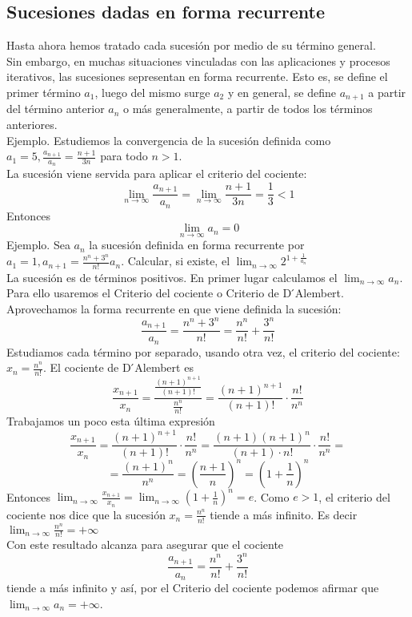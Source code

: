 \documentclass[../Teoría.root.tex]{subfiles}
\begin{document}
\subsection{Sucesiones dadas en forma recurrente}
Hasta ahora hemos tratado cada sucesión por medio de su término general.\\
Sin embargo, en muchas situaciones vinculadas con las aplicaciones y procesos iterativos, las sucesiones sepresentan en forma recurrente.
Esto es, se define el primer término \(a_1\), luego del mismo surge \(a_2\) y en general, se define \(a_{n+1}\) a partir del término anterior \(a_n\) o más generalmente, a partir de todos los términos anteriores.\\
Ejemplo.
Estudiemos la convergencia de la sucesión definida como \(a_1=5,\frac{a_{n+1}}{a_n}=\frac{n+1}{3n}\) para todo \(n>1\).\\
La sucesión viene servida para aplicar el criterio del cociente:
\[\lim_{n\to\infty}\frac{a_{n+1}}{a_n}=\lim_{n\to\infty}\frac{n+1}{3n}=\frac{1}{3}<1\]
Entonces
\[\lim_{n\to\infty}a_n=0\]
Ejemplo. Sea \(a_n\) la sucesión definida en forma recurrente por \(a_1=1,a_{n+1}=\frac{n^n+3^n}{n!}a_n\).
Calcular, si existe, el \(\lim_{n\to\infty}2^{1+\frac{1}{a_n}}\)\\
La sucesión es de términos positivos.
En primer lugar calculamos el \(\lim_{n\to\infty}a_n\).
Para ello usaremos el Criterio del cociente o Criterio de D ́Alembert.\\
Aprovechamos la forma recurrente en que viene definida la sucesión:
\[\frac{a_{n+1}}{a_n}=\frac{n^n+3^n}{n!}=\frac{n^n}{n!}+\frac{3^n}{n!}\]
Estudiamos cada término por separado, usando otra vez, el criterio del cociente:
\(x_n=\frac{n^n}{n!}\).
El cociente de D ́Alembert es
\[\frac{x_{n+1}}{x_n}=\frac{\frac{(n+1)^{n+1}}{(n+1)!}}{\frac{n^n}{n!}}=\frac{(n+1)^{n+1}}{(n+1)!}\cdot\frac{n!}{n^n}\]
Trabajamos un poco esta última expresión
\[\frac{x_{n+1}}{x_n}=\frac{(n+1)^{n+1}}{(n+1)!}\cdot\frac{n!}{n^n}=\frac{(n+1)(n+1)^n}{(n+1)\cdot n!}\cdot\frac{n!}{n^n}=\]
\[=\frac{(n+1)^n}{n^n}=\left(\frac{n+1}{n}\right)^n=\left(1+\frac{1}{n}\right)^n\]
Entonces \(\lim_{n\to\infty}\frac{x_{n+1}}{x_n}=\lim_{n\to\infty}\left(1+\frac{1}{n}\right)^n=e\).
Como \(e>1\), el criterio del cociente nos dice que la sucesión \(x_n=\frac{n^n}{n!}\) tiende a más infinito.
Es decir \(\lim_{n\to\infty}\frac{n^n}{n!}=+\infty\)\\
Con este resultado alcanza para asegurar que el cociente
\[\frac{a_{n+1}}{a_n}=\frac{n^n}{n!}+\frac{3^n}{n!}\]
tiende a más infinito y así, por el Criterio del cociente podemos afirmar que \(\lim_{n\to\infty}a_n=+\infty\).\\
\end{document}
